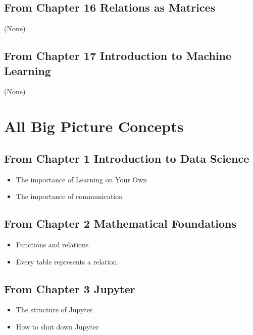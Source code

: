 \documentclass[letterpaper,10pt,english]{jupyterBook}
\begin{document}
\section{From Chapter 16 \sphinxhyphen{} Relations as Matrices}
\label{\detokenize{loyo-list:from-chapter-16-relations-as-matrices}}
\sphinxAtStartPar
(None)


\section{From Chapter 17 \sphinxhyphen{} Introduction to Machine Learning}
\label{\detokenize{loyo-list:from-chapter-17-introduction-to-machine-learning}}
\sphinxAtStartPar
(None)


\chapter{All Big Picture Concepts}
\label{\detokenize{bigpic-list:all-big-picture-concepts}}\label{\detokenize{bigpic-list::doc}}

\section{From Chapter 1 \sphinxhyphen{} Introduction to Data Science}
\label{\detokenize{bigpic-list:from-chapter-1-introduction-to-data-science}}\begin{itemize}
\item {} 
\sphinxAtStartPar
The importance of Learning on Your Own

\item {} 
\sphinxAtStartPar
The importance of communication

\end{itemize}


\section{From Chapter 2 \sphinxhyphen{} Mathematical Foundations}
\label{\detokenize{bigpic-list:from-chapter-2-mathematical-foundations}}\begin{itemize}
\item {} 
\sphinxAtStartPar
Functions and relations

\item {} 
\sphinxAtStartPar
Every table represents a relation.

\end{itemize}


\section{From Chapter 3 \sphinxhyphen{} Jupyter}
\label{\detokenize{bigpic-list:from-chapter-3-jupyter}}\begin{itemize}
\item {} 
\sphinxAtStartPar
The structure of Jupyter

\item {} 
\sphinxAtStartPar
How to shut down Jupyter

\end{itemize}
\end{document}

